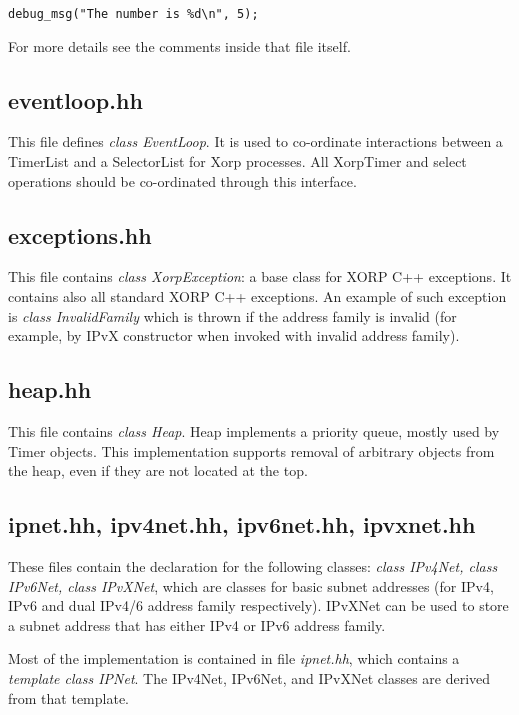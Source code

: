 \documentclass[11pt]{article}
\begin{document}
\verb=debug_msg("The number is %d\n", 5);=

For more details see the comments inside that file itself.


\subsection{eventloop.hh}

This file defines \emph{class EventLoop}.
It is used to co-ordinate interactions between a TimerList and a
SelectorList for Xorp processes.  All XorpTimer and select operations
should be co-ordinated through this interface.

\subsection{exceptions.hh}

This file contains \emph{class XorpException}: a base class for XORP C++
exceptions. It contains also all standard XORP C++ exceptions.
An example of such exception is \emph{class InvalidFamily} which is
thrown if the address family is invalid (for example, by IPvX
constructor when invoked with invalid address family).

\subsection{heap.hh}

This file contains \emph{class Heap}.
Heap implements a priority queue, mostly used by Timer
objects. This implementation supports removal of arbitrary
objects from the heap, even if they are not located at the top.


\subsection{ipnet.hh, ipv4net.hh, ipv6net.hh, ipvxnet.hh}

These files contain the declaration for the following classes:
\emph{class IPv4Net, class IPv6Net, class IPvXNet}, which are
classes for basic subnet addresses (for IPv4, IPv6 and dual IPv4/6
address family respectively). IPvXNet can be used to store a subnet
address that has either IPv4 or IPv6 address family.

Most of the implementation is contained in file \emph{ipnet.hh}, which
contains a \emph{template class IPNet}. The IPv4Net, IPv6Net, and
IPvXNet classes are derived from that template.
\end{document}
